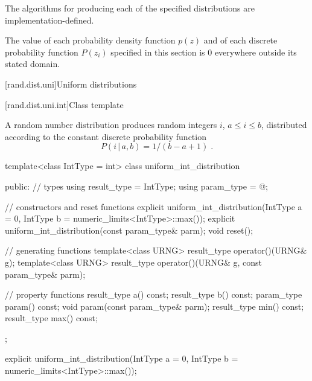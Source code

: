 \pnum
The algorithms
for producing each
of the specified distributions
are implementation-defined.

\pnum
The value of each probability density function $p(z)$
and of each discrete probability function $P(z_i)$
specified in this section
is $0$
everywhere outside its stated domain.


[rand.dist.uni]{Uniform distributions}%
%


[rand.dist.uni.int]{Class template }%
%

\pnum
A  random number distribution
produces random integers $i$,
$ a \leq i \leq b $,
distributed according to
the constant discrete probability function%
%
\[%
 P(i\,|\,a,b) = 1 / (b - a + 1)
\; \mbox{.}
\]

\begin{codeblock}
template<class IntType = int>
 class uniform_int_distribution
{
public:
 // types
 using result_type = IntType;
 using param_type  = @\unspec@;

 // constructors and reset functions
 explicit uniform_int_distribution(IntType a = 0, IntType b = numeric_limits<IntType>::max());
 explicit uniform_int_distribution(const param_type& parm);
 void reset();

 // generating functions
 template<class URNG>
   result_type operator()(URNG& g);
 template<class URNG>
   result_type operator()(URNG& g, const param_type& parm);

 // property functions
 result_type a() const;
 result_type b() const;
 param_type param() const;
 void param(const param_type& parm);
 result_type min() const;
 result_type max() const;
};
\end{codeblock}


%
\begin{itemdecl}
explicit uniform_int_distribution(IntType a = 0, IntType b = numeric_limits<IntType>::max());
\end{itemdecl}

